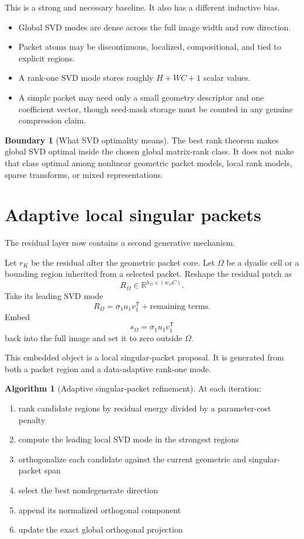 \documentclass[11pt]{article}
\theoremstyle{definition}
\newtheorem{algorithm}[theorem]{Algorithm}
\newtheorem{boundary}[theorem]{Boundary}
\theoremstyle{remark}
\newcommand{\R}{\mathbb R}
\begin{document}
This is a strong and necessary baseline. It also has a different inductive bias.

\begin{itemize}
\item Global SVD modes are dense across the full image width and row direction.
\item Packet atoms may be discontinuous, localized, compositional, and tied to explicit regions.
\item A rank-one SVD mode stores roughly $H+WC+1$ scalar values.
\item A simple packet may need only a small geometry descriptor and one coefficient vector, though seed-mask storage must be counted in any genuine compression claim.
\end{itemize}

\begin{boundary}[What SVD optimality means]
The best rank theorem makes global SVD optimal inside the chosen global matrix-rank class. It does not make that class optimal among nonlinear geometric packet models, local rank models, sparse transforms, or mixed representations.
\end{boundary}

\section{Adaptive local singular packets}
The residual layer now contains a second generative mechanism.

Let $r_K$ be the residual after the geometric packet core. Let $\Omega$ be a dyadic cell or a bounding region inherited from a selected packet. Reshape the residual patch as
\[
R_\Omega\in\R^{h_\Omega\times(w_\Omega C)}.
\]
Take its leading SVD mode
\[
R_\Omega
=\sigma_1u_1v_1^{\mathsf T}+\text{remaining terms}.
\]
Embed
\[
s_\Omega=\sigma_1u_1v_1^{\mathsf T}
\]
back into the full image and set it to zero outside $\Omega$.

This embedded object is a local singular-packet proposal. It is generated from both a packet region and a data-adaptive rank-one mode.

\begin{algorithm}[Adaptive singular-packet refinement]
At each iteration:
\begin{enumerate}
\item rank candidate regions by residual energy divided by a parameter-cost penalty
\item compute the leading local SVD mode in the strongest regions
\item orthogonalize each candidate against the current geometric and singular-packet span
\item select the best nondegenerate direction
\item append its normalized orthogonal component
\item update the exact global orthogonal projection
\end{enumerate}
\end{algorithm}
\end{document}

